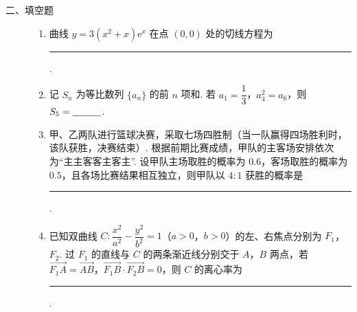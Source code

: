 \begin{description}

    \item[二、填空题]

    \begin{enumerate}[leftmargin=5pt]

      \addtocounter{enumi}{+12}

        \item 曲线 \(y=3(x^2+x){\mathrm{e}}^x\) 在点 \((0,0)\) 处的切线方程为\rule[-0.3ex]{3em}{0.4pt}.

        \item 记 \(S_n\) 为等比数列 \(\{a_n\}\) 的前 \(n\) 项和. 若 \(a_1=\dfrac13\)，\(a_4^2=a_6\)，则 \(S_5=\rule[-0.3ex]{3em}{0.4pt}\).

        \item 甲、乙两队进行篮球决赛，采取七场四胜制（当一队赢得四场胜利时，该队获胜，决赛结束）. 根据前期比赛成绩，甲队的主客场安排依次为“主主客客主客主”. 设甲队主场取胜的概率为 \(0.6\)，客场取胜的概率为 \(0.5\)，且各场比赛结果相互独立，则甲队以 \(4:1\) 获胜的概率是\rule[-0.3ex]{3em}{0.4pt}.

        \item 已知双曲线 \(C:\dfrac{x^2}{a^2}-\dfrac{y^2}{b^2}=1\)（\(a>0\)，\(b>0\)）的左、右焦点分别为 \(F_1\)，\(F_2\). 过 \(F_1\) 的直线与 \(C\) 的两条渐近线分别交于 \(A\)，\(B\) 两点，若 \(\overrightarrow{F_1A}=\overrightarrow{AB}\)，\(\overrightarrow{F_1B}\cdot\overrightarrow{F_2B}=0\)，则 \(C\) 的离心率为\rule[-0.3ex]{3em}{0.4pt}.

    \end{enumerate}

\end{description}

